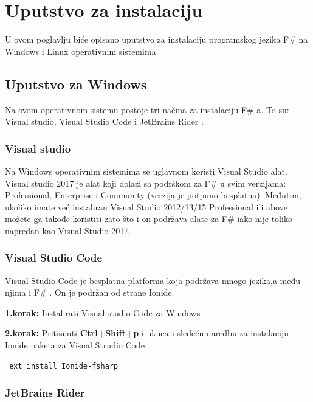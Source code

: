 \documentclass[a4paper]{article}
\begin{document}
\section{Uputstvo za instalaciju}

U ovom poglavlju biće opisano uputstvo za instalaciju programskog jezika F\# na Windows i Linux operativnim sistemima.

\subsection{Uputstvo za Windows}

Na ovom operativnom sistemu postoje tri načina za instalaciju F\#-a. To su: Visual studio\cite{vStud}, Visual Studio Code \cite{vStudCode} i JetBrains Rider \cite{jetBrains}.

\subsubsection{Visual studio}
	
Na Windows operativnim sistemima se uglavnom koristi Visual Studio alat. Visual studio 2017 je alat koji dolazi sa podrškom za F\# u svim verzijama: Professional, Enterprise i Community (verzija je potpuno besplatna). Međutim, ukoliko imate  već instaliran Visual Studio 2012/13/15  Professional ili above možete ga takođe koristiti zato što i on podržava alate za F\# iako nije toliko napredan kao Visual Studio 2017.

\subsubsection{Visual Studio Code}
	
Visual Studio Code je besplatna platforma koja podržava mnogo jezika,a među njima i F\# . On je podržan od strane Ionide\cite{ionide}.

\textbf{1.korak:} Instalirati Visual studio Code za Windows

\textbf{2.korak:} Pritisnuti \textbf{Ctrl+Shift+p} i ukucati sledeću naredbu za instalaciju Ionide paketa za Visual Strudio Code:
\\
\begin{lstlisting}
 ext install Ionide-fsharp
\end{lstlisting}
 
\subsubsection{JetBrains Rider}
\end{document}
